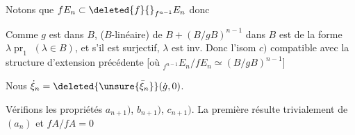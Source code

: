 Notons que  $fE_n\subset\deleted{f}{}_{f^{n-1}}E_n$ donc

Comme $g$ est  dans $B$,
($B$-linéaire) de $B+(B/gB)^{n-1}$ dans $B$ est de la
 forme $\lambda\operatorname{pr}_1$ $(\lambda\in B)$, et s'il
 est surjectif, $\lambda$ est inv. Donc l'isom
$c)$  compatible avec la structure
d'extension précédente [où ${}_{f^{n-1}}E_n/fE_n\simeq(B/gB)^{n-1}$]

Nous  $\dot\xi_n=\deleted{\unsure{\bar\xi_n}}(\dot g,0)$. 

Vérifions les propriétés $a_{n+1})$, $b_{n+1})$, $c_{n+1})$.
La première résulte trivialement de $(a_n)$ et $fA/fA=0$

